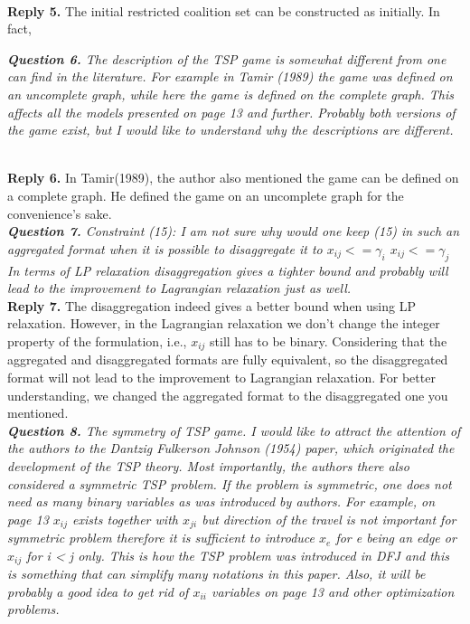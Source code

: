 \documentclass[11pt]{article}
\begin{document}
\\[2mm]
\noindent \textbf{Reply 5.}
The initial restricted coalition set can be constructed as
initially.
In fact,

%
%
%
\noindent \textit{\textbf{Question 6.}
The description of the TSP game is somewhat different from one can find in the literature. For example in Tamir (1989) the game was defined on an uncomplete graph, while here the game is defined on the complete graph. This affects all the models presented on page 13 and further. Probably both versions of the game exist, but I would like to understand why the descriptions are different.}

\\[2mm]
\noindent \textbf{Reply 6.}
In Tamir(1989), the author also mentioned the game can be defined on a complete graph. He defined the game on an uncomplete graph for the convenience's sake.
\\[4mm]


\noindent \textit{\textbf{Question 7.}
Constraint (15): I am not sure why would one keep (15) in such an aggregated format when it is possible to disaggregate it to
$x_{ij} <= \gamma_i$
$x_{ij} <= \gamma_j$
In terms of LP relaxation disaggregation gives a tighter bound and probably will lead to the improvement to Lagrangian relaxation just as well.}
\\[2mm]
\noindent \textbf{Reply 7.}
The disaggregation indeed gives a better bound when using LP relaxation.
However, in the Lagrangian relaxation we don't change the integer property of the formulation, i.e., $x_{ij}$ still has to be binary.
Considering that the aggregated and disaggregated formats are fully equivalent, so the disaggregated format will not lead to the improvement to Lagrangian relaxation.
For better understanding, we changed the aggregated format to the disaggregated one you mentioned.
\\[4mm]


\noindent \textit{\textbf{Question 8.}
The symmetry of TSP game. I would like to attract the attention of the authors to the Dantzig Fulkerson Johnson (1954) paper, which originated the development of the TSP theory. Most importantly, the authors there also considered a symmetric TSP problem. If the problem is symmetric, one does not need as many binary variables as was introduced by authors. For example, on page 13 $x_{ij}$ exists together with $x_{ji}$ but direction of the travel is not important for symmetric problem therefore it is sufficient to introduce $x_e$ for e being an edge or $x_{ij}$ for i < j only. This is how the TSP problem was introduced in DFJ and this is something that can simplify many notations in this paper. Also, it will be probably a good idea to get rid of $x_{ii}$ variables on page 13 and other optimization problems.}
\end{document}
